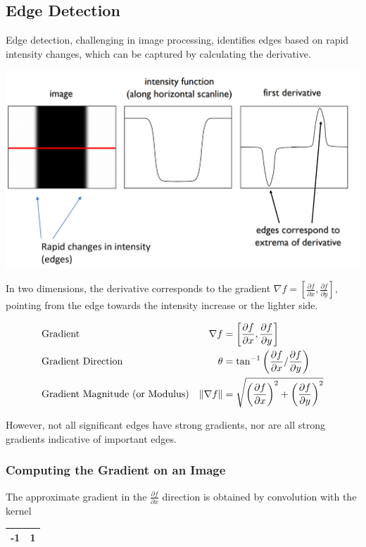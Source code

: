 \subsection{Edge Detection}
Edge detection, challenging in image processing, identifies edges based on rapid intensity changes,
which can be captured by calculating the derivative.

\begin{center}
    \includegraphics[width=0.6\linewidth]{img/1D_edge_derivative}
\end{center}

In two dimensions, the derivative corresponds to the gradient $\nabla f = \left[\frac{\partial f}{\partial x},\frac{\partial f}{\partial y}\right]$,
pointing from the edge towards the intensity increase or the lighter side.

\begin{align}
    & \text{Gradient} & \nabla f &= \left[ \frac{\partial f}{\partial x}, \frac{\partial f}{\partial y} \right] \\
    & \text{Gradient Direction} & \theta &= \tan^{-1} \left( \frac{\partial f}{\partial x} / \frac{\partial f}{\partial y} \right) \\
    & \text{Gradient Magnitude (or Modulus)} & \lVert\nabla f\rVert &= \sqrt{\left(\frac{\partial f}{\partial x}\right)^2 + \left(\frac{\partial f}{\partial y} \right)^2 }
\end{align}

However, not all significant edges have strong gradients, nor are all strong gradients indicative of important edges.

\subsubsection{Computing the Gradient on an Image}
The approximate gradient in the $ \frac{\partial f}{\partial x} $ direction is obtained by convolution with the kernel \begin{tabular}{|c|c|}
    \hline
    -1 & 1\\
    \hline
\end{tabular}

